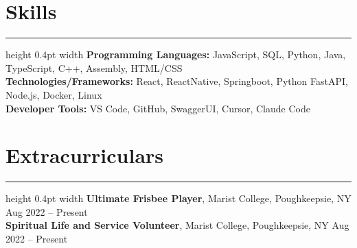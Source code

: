 \documentclass[letterpaper,9pt]{article}
\begin{document}
\section*{Skills}
\hrule height 0.4pt width \textwidth \vspace{2pt}
\textbf{Programming Languages:} JavaScript, SQL, Python, Java, TypeScript, C++, Assembly, HTML/CSS \\
\textbf{Technologies/Frameworks:} React, ReactNative, Springboot, Python FastAPI, Node.js, Docker, Linux \\
\textbf{Developer Tools:} VS Code, GitHub, SwaggerUI, Cursor, Claude Code

\section*{Extracurriculars}
\hrule height 0.4pt width \textwidth \vspace{2pt}
\textbf{Ultimate Frisbee Player}, Marist College, Poughkeepsie, NY \hfill Aug 2022 -- Present \\
\textbf{Spiritual Life and Service Volunteer}, Marist College, Poughkeepsie, NY \hfill Aug 2022 -- Present
\end{document}
